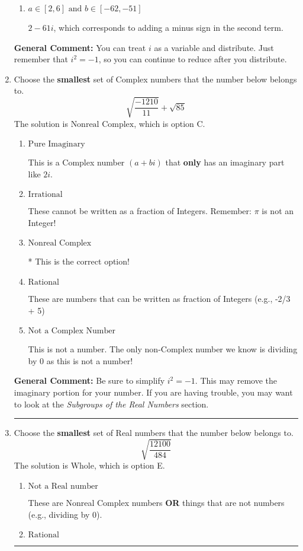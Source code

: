 \documentclass{extbook}[14pt]
\newcommand{\litem}[1]{\item #1

\rule{\textwidth}{0.4pt}}
\begin{document}
\begin{enumerate}
{\begin{enumerate}[label=\Alph*.]
* $58 - 19 i$, which is the correct option.
\item \( a \in [2, 6] \text{ and } b \in [-62, -51] \)

 $2 - 61 i$, which corresponds to adding a minus sign in the second term.
\end{enumerate}

\textbf{General Comment:} You can treat $i$ as a variable and distribute. Just remember that $i^2=-1$, so you can continue to reduce after you distribute.
}
\litem{
Choose the \textbf{smallest} set of Complex numbers that the number below belongs to.
\[ \sqrt{\frac{-1210}{11}}+\sqrt{85} \]
The solution is \( \text{Nonreal Complex} \), which is option C.\begin{enumerate}[label=\Alph*.]
\item \( \text{Pure Imaginary} \)

This is a Complex number $(a+bi)$ that \textbf{only} has an imaginary part like $2i$.
\item \( \text{Irrational} \)

These cannot be written as a fraction of Integers. Remember: $\pi$ is not an Integer!
\item \( \text{Nonreal Complex} \)

* This is the correct option!
\item \( \text{Rational} \)

These are numbers that can be written as fraction of Integers (e.g., -2/3 + 5)
\item \( \text{Not a Complex Number} \)

This is not a number. The only non-Complex number we know is dividing by 0 as this is not a number!
\end{enumerate}

\textbf{General Comment:} Be sure to simplify $i^2 = -1$. This may remove the imaginary portion for your number. If you are having trouble, you may want to look at the \textit{Subgroups of the Real Numbers} section.
}
\litem{
Choose the \textbf{smallest} set of Real numbers that the number below belongs to.
\[ \sqrt{\frac{12100}{484}} \]
The solution is \( \text{Whole} \), which is option E.\begin{enumerate}[label=\Alph*.]
\item \( \text{Not a Real number} \)

These are Nonreal Complex numbers \textbf{OR} things that are not numbers (e.g., dividing by 0).
\item \( \text{Rational} \)


\end{enumerate}}
\end{enumerate}
\end{document}
